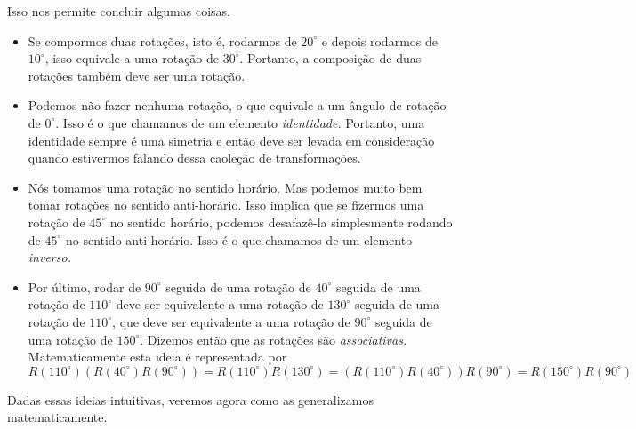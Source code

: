 \documentclass{article}
\numberwithin{equation}{section}
\numberwithin{figure}{section}
\begin{document}
Isso nos permite concluir algumas coisas. 
\begin{itemize}
	\item Se compormos duas rotações, isto é, rodarmos de $20^{\circ}$ e depois rodarmos de $10^{\circ}$, isso equivale a uma rotação de $30^{\circ}$. Portanto, a composição de duas rotações também deve ser uma rotação. 
	\item Podemos não fazer nenhuma rotação, o que equivale a um ângulo de rotação de $0^{\circ}$. Isso é o que chamamos de um elemento \textit{identidade.} Portanto, uma identidade sempre é uma simetria e então deve ser levada em consideração quando estivermos falando dessa caoleção de transformações. 
	\item Nós tomamos uma rotação no sentido horário. Mas podemos muito bem tomar rotações no sentido anti-horário. Isso implica que se fizermos uma rotação de $45^{\circ}$ no sentido horário, podemos desafazê-la simplesmente rodando de $45^{\circ}$ no sentido anti-horário. Isso é o que chamamos de um elemento \textit{inverso.}
	\item Por último, rodar de $90^{\circ}$ seguida de uma rotação de $40^{\circ}$ seguida de uma rotação de $110^{\circ}$ deve ser equivalente a uma rotação de $130^{\circ}$ seguida de uma rotação de $110^{\circ}$, que deve ser equivalente a uma rotação de $90^{\circ}$ seguida de uma rotação de $150^{\circ}$. Dizemos então que as rotações são \textit{associativas.} Matematicamente esta ideia é representada por 
	$$
	R(110^{\circ})(R(40^{\circ})R(90^{\circ}))=R(110^{\circ})R(130^{\circ})=(R(110^{\circ})R(40^{\circ}))R(90^{\circ})=R(150^{\circ})R(90^{\circ})
	$$
\end{itemize}
Dadas essas ideias intuitivas, veremos agora como as generalizamos matematicamente.  
\end{document}
